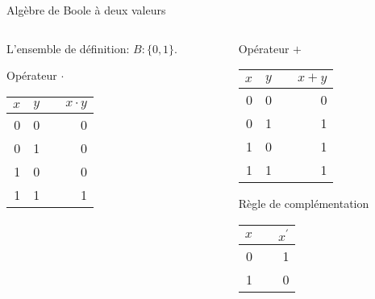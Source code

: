 \documentclass[presentation]{beamer}
\begin{document}
\begin{frame}[label={sec:org5da0777}]{Algèbre de Boole à deux valeurs}
\begin{columns}
\begin{column}{0.48\columnwidth}
\begin{block}{}
L'ensemble de définition: \(B : \{0, 1 \}\).

Opérateur \(\cdot\)

\begin{center}
\begin{tabular}{rrlr}
\(x\) & \(y\) &  & \(x \cdot y\)\\
\hline
0 & 0 &  & 0\\
0 & 1 &  & 0\\
1 & 0 &  & 0\\
1 & 1 &  & 1\\
\end{tabular}
\end{center}
\end{block}
\end{column}


\begin{column}{0.48\columnwidth}
\begin{block}{}
Opérateur \(+\)

\begin{center}
\begin{tabular}{rrlr}
\(x\) & \(y\) &  & \(x + y\)\\
\hline
0 & 0 &  & 0\\
0 & 1 &  & 1\\
1 & 0 &  & 1\\
1 & 1 &  & 1\\
\end{tabular}
\end{center}

Règle de complémentation

\begin{center}
\begin{tabular}{rlr}
\(x\) &  & \(x^{\prime}\)\\
\hline
0 &  & 1\\
1 &  & 0\\
\end{tabular}
\end{center}
\end{block}
\end{column}
\end{columns}
\end{frame}
\end{document}
